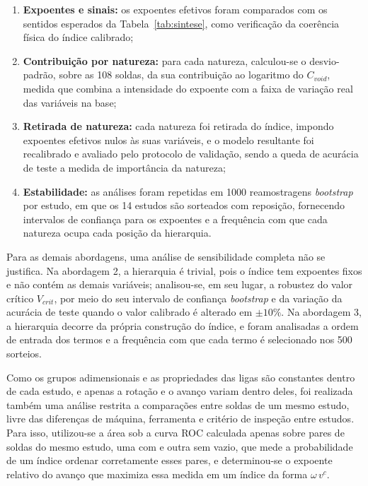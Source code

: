 \documentclass[12pt,openany]{report}
\begin{document}
\begin{enumerate}
\item \textbf{Expoentes e sinais:} os expoentes efetivos foram comparados com os sentidos esperados da Tabela~\ref{tab:sintese}, como verificação da coerência física do índice calibrado;
\item \textbf{Contribuição por natureza:} para cada natureza, calculou-se o desvio-padrão, sobre as 108 soldas, da sua contribuição ao logaritmo do $C_{void}$, medida que combina a intensidade do expoente com a faixa de variação real das variáveis na base;
\item \textbf{Retirada de natureza:} cada natureza foi retirada do índice, impondo expoentes efetivos nulos às suas variáveis, e o modelo resultante foi recalibrado e avaliado pelo protocolo de validação, sendo a queda de acurácia de teste a medida de importância da natureza;
\item \textbf{Estabilidade:} as análises foram repetidas em 1000 reamostragens \textit{bootstrap} por estudo, em que os 14 estudos são sorteados com reposição, fornecendo intervalos de confiança para os expoentes e a frequência com que cada natureza ocupa cada posição da hierarquia.
\end{enumerate}

Para as demais abordagens, uma análise de sensibilidade completa não se justifica. Na abordagem 2, a hierarquia é trivial, pois o índice tem expoentes fixos e não contém as demais variáveis; analisou-se, em seu lugar, a robustez do valor crítico $V_{crit}$, por meio do seu intervalo de confiança \textit{bootstrap} e da variação da acurácia de teste quando o valor calibrado é alterado em $\pm10\%$. Na abordagem 3, a hierarquia decorre da própria construção do índice, e foram analisadas a ordem de entrada dos termos e a frequência com que cada termo é selecionado nos 500 sorteios.

Como os grupos adimensionais e as propriedades das ligas são constantes dentro de cada estudo, e apenas a rotação e o avanço variam dentro deles, foi realizada também uma análise restrita a comparações entre soldas de um mesmo estudo, livre das diferenças de máquina, ferramenta e critério de inspeção entre estudos. Para isso, utilizou-se a área sob a curva ROC calculada apenas sobre pares de soldas do mesmo estudo, uma com e outra sem vazio, que mede a probabilidade de um índice ordenar corretamente esses pares, e determinou-se o expoente relativo do avanço que maximiza essa medida em um índice da forma $\omega\,v^{c}$.
\end{document}
